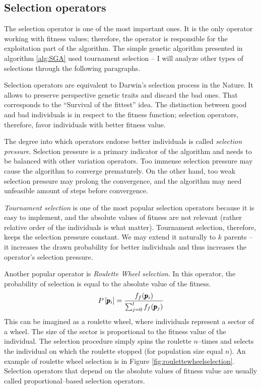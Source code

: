 \subsection{Selection operators}

The selection operator is one of the most important ones. It is the only operator working with fitness values; therefore, the operator is responsible for the exploitation part of the algorithm. The simple genetic algorithm presented in algorithm \ref{alg:SGA} used tournament selection -- I will analyze other types of selections through the following paragraphs.

Selection operators are equivalent to Darwin's selection process in the Nature. It allows to preserve perspective genetic traits and discard the bad ones. That corresponds to the \enquote{Survival of the fittest} idea. The distinction between good and bad individuals is in respect to the fitness function; selection operators, therefore, favor individuals with better fitness value.

The degree into which operators endorse better individuals is called \emph{selection pressure}. Selection pressure is a primary indicator of the algorithm and needs to be balanced with other variation operators. Too immense selection pressure may cause the algorithm to converge prematurely. On the other hand, too weak selection pressure may prolong the convergence, and the algorithm may need unfeasible amount of steps before convergence.

\emph{Tournament selection} is one of the most popular selection operators because it is easy to implement, and the absolute values of fitness are not relevant (rather relative order of the individuals is what matter). Tournament selection, therefore, keeps the selection pressure constant. We may extend it naturally to $k$ parents -- it increases the drawn probability for better individuals and thus increases the operator's selection pressure.

Another popular operator is \emph{Roulette Wheel selection}. In this operator, the probability of selection is equal to the absolute value of the fitness.
$$ P\left[\pmb{p}_i\right] = \frac{f_f(\pmb{p}_i)}{\sum_{j=0}^{l}f_f(\pmb{p}_j)} $$
This can be imagined as a roulette wheel, where individuals represent a sector of a wheel. The size of the sector is proportional to the fitness value of the individual. The selection procedure simply spins the roulette $n$--times and selects the individual on which the roulette stopped (for population size equal $n$). An example of roulette wheel selection is in Figure \ref{fig:roulettewheelselection}. Selection operators that depend on the absolute values of fitness value are usually called proportional--based selection operators.


